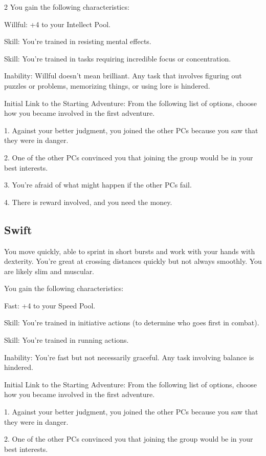 \begin{multicols}{2}
You gain the following characteristics:

Willful: +4 to your Intellect Pool.

Skill: You’re trained in resisting mental effects.

Skill: You’re trained in tasks requiring incredible focus or concentration.

Inability: Willful doesn’t mean brilliant. Any task that involves figuring out puzzles or problems, memorizing things, or using lore is hindered.

Initial Link to the Starting Adventure: From the following list of options, choose how you became involved in the first adventure.

1. Against your better judgment, you joined the other PCs because you saw that they were in danger.

2. One of the other PCs convinced you that joining the group would be in your best interests.

3. You’re afraid of what might happen if the other PCs fail.

4. There is reward involved, and you need the money.

\subsection{Swift}

You move quickly, able to sprint in short bursts and work with your hands with dexterity. You’re great at crossing distances quickly but not always smoothly. You are likely slim and muscular.

You gain the following characteristics:

Fast: +4 to your Speed Pool.

Skill: You’re trained in initiative actions (to determine who goes first in combat).

Skill: You’re trained in running actions.

Inability: You’re fast but not necessarily graceful. Any task involving balance is hindered.

Initial Link to the Starting Adventure: From the following list of options, choose how you became involved in the first adventure.

1. Against your better judgment, you joined the other PCs because you saw that they were in danger.

2. One of the other PCs convinced you that joining the group would be in your best interests.


\end{multicols}
